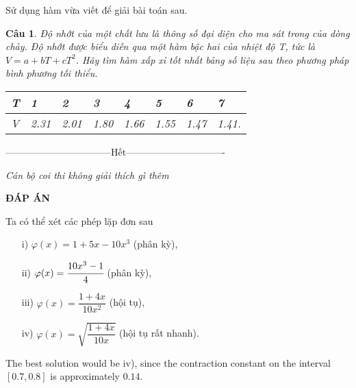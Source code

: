 \documentclass[11pt]{article}
\newtheorem{bt}{Câu}
\begin{document}
Sử dụng hàm vừa viết để giải bài toán sau.

\begin{bt} %
	Độ nhớt của một chất lưu là thông số đại diện cho ma sát trong của dòng chảy. Độ nhớt được biểu diễn qua một hàm bậc hai của nhiệt độ T, tức là $V = a + bT + cT^2$. Hãy tìm hàm xấp xỉ tốt nhất bảng số liệu sau theo phương pháp bình phương tối thiểu.
	\begin{center}
		\begin{tabular}[7]{l|l|l|l|l|l|l|l}
			T & 1    & 2    & 3    & 4    & 5    & 6    & 7 \\ \hline
			V & 2.31 & 2.01 & 1.80 & 1.66 & 1.55 & 1.47 & 1.41.
		\end{tabular}	
	\end{center}
\end{bt}

\centerline{———————————Hết——————————-}



\vspace{1cm}
 {\it Cán bộ coi thi không giải thích gì thêm}\\
\newpage
\begin{center}
{\LARGE{\bf ĐÁP ÁN}}
\end{center}

\begin{sol}
Ta có thể xét các phép lặp đơn sau 
\begin{enumerate}
\item[i)] $\varphi(x) = 1+5x-10x^3$ (phân kỳ),
\item[ii)] $\varphi(x) = \cfrac{10x^3-1}{4}$ (phân kỳ),
\item[iii)] $\varphi(x) = \dfrac{1+4x}{10x^2}$ (hội tụ),
\item[iv)] $\varphi(x) = \sqrt{\dfrac{1+4x}{10x}}$ (hội tụ rất nhanh).
\end{enumerate}
%
The best solution would be iv), since the contraction constant on the interval $[0.7,0.8]$ is approximately $0.14$.
\end{sol}
   
\end{document}
